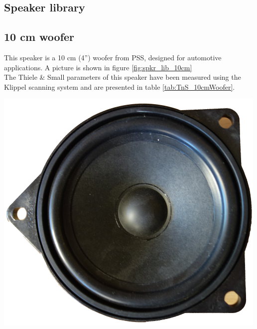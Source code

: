 \documentclass{report}
\begin{document}
\begin{appendices}
\chapter{Speaker library}
\label{chap:spk_lib}

\section{10 cm woofer}
\label{spkrlib:10cm}

\begin{minipage}{0.6\textwidth}
This speaker is a 10 cm (4'') woofer from PSS, designed for automotive applications. A picture is shown in figure \ref{fig:spkr_lib_10cm}\\ 
The Thiele \& Small  parameters of this speaker have been measured using the Klippel scanning system and are presented in table \ref{tab:TnS_10cmWoofer}. 
\end{minipage}
\begin{minipage}{0.4\textwidth}
\begin{center}
	\includegraphics[scale=1]{Appendix/Round_Spkr}
    \captionsetup{hypcap=false}
    \label{fig:spkr_lib_10cm}
\end{center}
\end{minipage}





\end{appendices}
\end{document}
